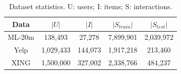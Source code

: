 \documentclass[letterpaper]{article} %
\newcommand{\xing}{\textsf{XING}}
\newcommand{\yelp}{\textsf{Yelp}}
\newcommand{\movieone}{\textsf{ML-1m}}
\newcommand{\movietwenty}{\textsf{ML-20m}}
\begin{document}
\begin{table}
\centering
\small{
\begin{tabular}{|c|c|c|c|c|}
\hline
\textbf{Data}   & $\left|U\right|$ & $\left|I\right|$ & $\left|S_{train}\right|$ & $\left|S_{test}\right|$ \\
\hline
\movietwenty   & 138,493  & 27,278 & 7,899,901 & 2,039,972  \\ \hline
\yelp       & 1,029,433     & 144,073  &  1,917,218 & 213,460  \\ \hline
\xing       & 1,500,000     & 327,002  & 2,338,766  & 484,237  \\ \hline
\end{tabular}
}
\caption{Dataset statistics. U: users; I: items; S: interactions.}
\label{t:data1}
\end{table}
\end{document}
